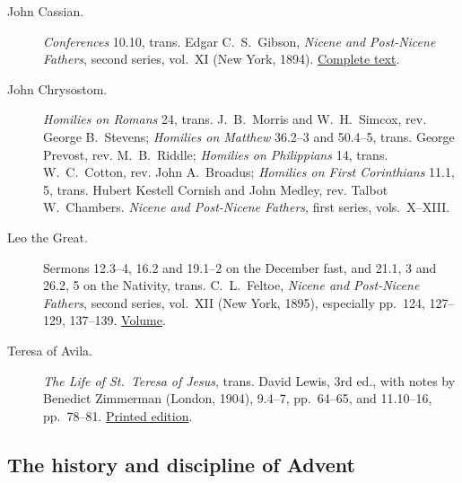 \begin{description}
\item[John Cassian.] \textit{Conferences} 10.10, trans. Edgar
  C.~S.~Gibson, \textit{Nicene and Post-Nicene Fathers}, second series,
  vol.~XI (New York, 1894).
  \href{https://www.ccel.org/ccel/c/cassian/conferences/cache/conferences.txt}{Complete text}.

\item[John Chrysostom.] \textit{Homilies on Romans} 24, trans. J.~B.~Morris
  and W.~H.~Simcox, rev. George B.~Stevens; \textit{Homilies on Matthew}
  36.2--3 and 50.4--5, trans. George Prevost, rev. M.~B.~Riddle;
  \textit{Homilies on Philippians} 14, trans. W.~C.~Cotton, rev.
  John A.~Broadus; \textit{Homilies on First Corinthians} 11.1, 5,
  trans. Hubert Kestell Cornish and John Medley, rev. Talbot W.~Chambers.
  \textit{Nicene and Post-Nicene Fathers}, first series, vols.~X--XIII.

\item[Leo the Great.] Sermons 12.3--4, 16.2 and 19.1--2 on the December
  fast, and 21.1, 3 and 26.2, 5 on the Nativity, trans. C.~L.~Feltoe,
  \textit{Nicene and Post-Nicene Fathers}, second series, vol.~XII
  (New York, 1895), especially pp.~124, 127--129, 137--139.
  \href{https://www.ccel.org/ccel/schaff/npnf212.html}{Volume}.

\item[Teresa of Avila.] \textit{The Life of St.~Teresa of Jesus},
  trans. David Lewis, 3rd ed., with notes by Benedict Zimmerman
  (London, 1904), 9.4--7, pp.~64--65, and 11.10--16, pp.~78--81.
  \href{https://archive.org/details/lifeofteresajesu00tereuoft}{Printed edition}.
\end{description}

\subsection{The history and discipline of Advent}

